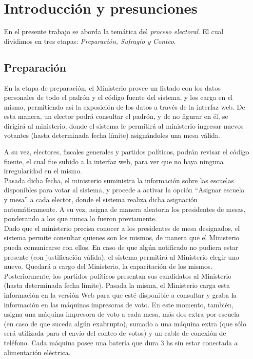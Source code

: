 \section{Introducci\'on y presunciones}

En el presente trabajo se aborda la tem\'atica del \emph{proceso electoral}. El cual dividimos en tres etapas: \textit{Preparaci\'on, Sufragio y Conteo}.\\


\subsection{Preparación}

En la etapa de preparación, el Ministerio provee un listado con los datos personales de todo el padrón y el c\'odigo fuente del sistema, y los carga en el mismo, permitiendo así la exposición de los datos a través de la interfaz web. De esta manera, un elector podrá consultar el padrón, y de no figurar en él, se dirigirá al ministerio, donde el sistema le permitirá al ministerio ingresar nuevos votantes  (hasta determinada fecha límite) asignándoles una mesa válida. 

A su vez, electores, fiscales generales y partidos políticos, podrán revisar el código fuente, el cual fue subido a la interfaz web, para ver que no haya ninguna irregularidad en el mismo.\\

Pasada dicha fecha, el ministerio suministra la información sobre las escuelas disponibles para votar al sistema, y procede a activar la opción “Asignar escuela y mesa” a cada elector, donde el sistema realiza dicha asignación automáticamente. A su vez, asigna de manera aleatoria los presidentes de mesas, ponderando a los que nunca lo fueron previamente.\\

Dado que el ministerio precisa conocer a los presidentes de mesa designados, el sistema permite consultar quienes son los mismos, de manera que el Ministerio pueda comunicarse con ellos. En caso de que algún notificado no pudiera estar presente (con justificación válida), el sistema permitirá al Ministerio elegir uno nuevo. Quedará a cargo del Ministerio, la capacitación de los mismos.\\

Posteriormente, los partidos políticos presentan sus candidatos al Ministerio (hasta determinada fecha límite). Pasada la misma, el Ministerio carga esta información en la versión Web para que esté disponible a consultar y graba la información en las máquinas impresoras de voto. En este momento, también, asigna una máquina impresora de voto a cada mesa, más dos extra por escuela (en caso de que suceda algún exabrupto), sumado a una máquina extra (que sólo será utilizada para el envío del conteo de votos) y un cable de conexión de teléfono. Cada máquina posee una batería que dura 3 hs sin estar conectada a alimentación eléctrica. 


